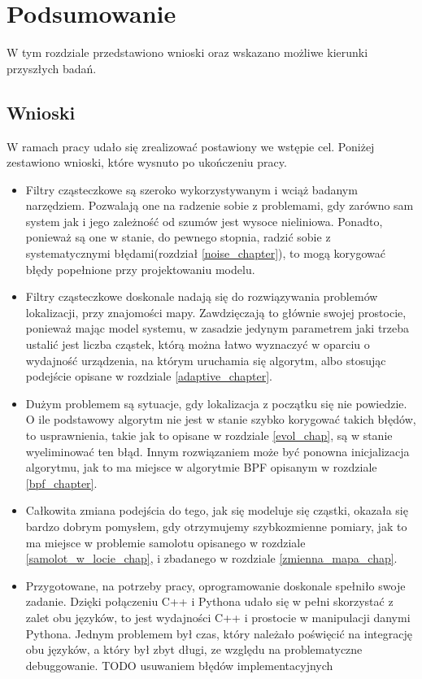 \chapter{Podsumowanie}
W tym rozdziale przedstawiono wnioski oraz wskazano możliwe kierunki przyszłych badań.
\section{Wnioski}
W ramach pracy udało się zrealizować postawiony we wstępie cel. Poniżej zestawiono wnioski, które wysnuto po ukończeniu pracy.
\begin{itemize}
	\item Filtry cząsteczkowe są szeroko wykorzystywanym i wciąż badanym narzędziem. Pozwalają one na radzenie sobie z problemami, gdy zarówno sam system jak i jego zależność od szumów jest wysoce nieliniowa. Ponadto, ponieważ są one w stanie, do pewnego stopnia, radzić sobie z systematycznymi błędami(rozdział \ref{noise_chapter}), to mogą korygować błędy popełnione przy projektowaniu modelu.
	\item Filtry cząsteczkowe doskonale nadają się do rozwiązywania problemów lokalizacji, przy znajomości mapy. Zawdzięczają to głównie swojej prostocie, ponieważ mając model systemu, w zasadzie jedynym parametrem jaki trzeba ustalić jest liczba cząstek, którą można łatwo wyznaczyć w oparciu o wydajność urządzenia, na którym uruchamia się algorytm, albo stosując podejście opisane w rozdziale \ref{adaptive_chapter}.
	\item Dużym problemem są sytuacje, gdy lokalizacja z początku się nie powiedzie. O ile podstawowy algorytm nie jest w stanie szybko korygować takich błędów, to usprawnienia, takie jak to opisane w rozdziale \ref{evol_chap}, są w stanie wyeliminować ten błąd. Innym rozwiązaniem może być ponowna inicjalizacja algorytmu, jak to ma miejsce w algorytmie BPF opisanym w rozdziale \ref{bpf_chapter}.
	\item Całkowita zmiana podejścia do tego, jak się modeluje się cząstki, okazała się bardzo dobrym pomysłem, gdy otrzymujemy szybkozmienne pomiary, jak to ma miejsce w problemie samolotu opisanego w rozdziale \ref{samolot_w_locie_chap}, i zbadanego w rozdziale \ref{zmienna_mapa_chap}.
	\item Przygotowane, na potrzeby pracy, oprogramowanie doskonale spełniło swoje zadanie. Dzięki połączeniu C++ i Pythona udało się w pełni skorzystać z zalet obu języków, to jest wydajności C++ i prostocie w manipulacji danymi Pythona. Jednym problemem był czas, który należało poświęcić na integrację obu języków, a który był zbyt długi, ze względu na problematyczne debuggowanie. TODO usuwaniem błędów implementacyjnych
\end{itemize}

